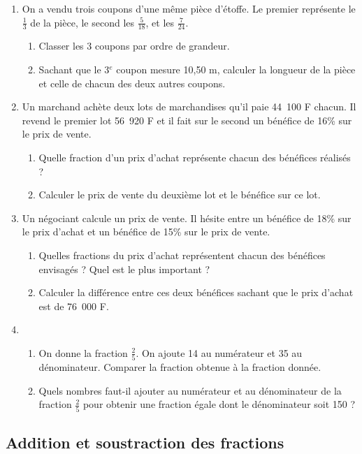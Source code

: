 \documentclass[12 pt]{extarticle}
\theoremstyle{plain}
\begin{document}
\begin{enumerate}
\item On a vendu trois coupons d'une même pièce d'étoffe. Le premier représente le $\frac13$ de la pièce, le second les $\frac5{18}$, et les $\frac{7}{24}$. \begin{enumerate}
\item Classer les 3 coupons par ordre de grandeur. 
\item Sachant que le 3${}^e$ coupon mesure 10,50 m, 
calculer la longueur de la pièce et celle de chacun des deux autres coupons. 
\end{enumerate}
\item Un marchand achète deux lots de marchandises qu'il paie 44~100 F chacun. Il revend le premier lot 56~920 F et il fait sur le second un bénéfice de 16\% sur le prix de vente. \begin{enumerate}
\item Quelle fraction d'un prix d'achat représente chacun des bénéfices réalisés ? 
\item Calculer le prix de vente du deuxième lot et 
le bénéfice sur ce lot. 
\end{enumerate} 
\item Un négociant calcule un prix de vente. Il hésite entre un bénéfice de 18\% sur le prix d'achat et un bénéfice de 15\% sur le prix de vente. \begin{enumerate}
\item Quelles fractions du prix d'achat représentent chacun des bénéfices envisagés ? Quel est le plus important ? 
\item Calculer la différence entre ces deux bénéfices 
sachant que le prix d'achat est de 76~000 F. 
\end{enumerate}
\item \begin{enumerate}
\item On donne la fraction $\frac25$. On ajoute 14 au numérateur et 35 au dénominateur. Comparer la fraction obtenue à la fraction donnée. 
\item Quels nombres faut-il ajouter au numérateur et au dénominateur de la fraction $\frac25$ pour obtenir une fraction égale dont le dénominateur soit 150 ?
\end{enumerate}
\end{enumerate}

\subsection{Addition et soustraction des fractions}
\end{document}
